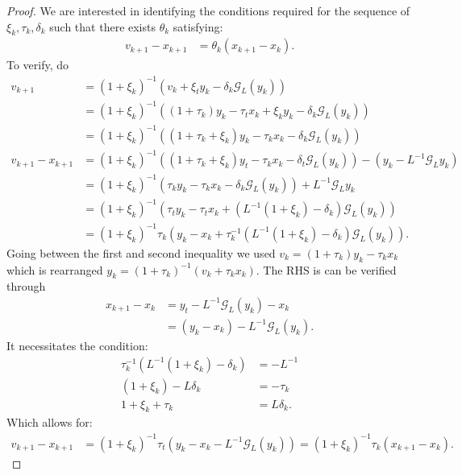 \documentclass[12pt]{article}
\begin{document}
    \begin{proof}
        We are interested in identifying the conditions required for the sequence of $\xi_k, \tau_k, \delta_k$ such that there exists $\theta_k$ satisfying: 
        \begin{align*}
            v_{k + 1} - x_{k + 1} 
            &= \theta_k(x_{k + 1} - x_k).
        \end{align*}
        To verify, do 
        \begin{align*}
            v_{k + 1} &= 
            (1 + \xi_k)^{-1}(v_k + \xi_t y_k - \delta_k \mathcal G_L(y_k))
            \\
            &= 
            (1 + \xi_k)^{-1}((1 + \tau_k)y_k - \tau_t x_k + \xi_k y_k - \delta_k \mathcal G_L(y_k))
            \\
            &= 
            (1 + \xi_k)^{-1}((1 + \tau_k + \xi_k)y_k - \tau_k x_k - \delta_k \mathcal G_L(y_k))
            \\
            v_{k + 1} - x_{k + 1}
            &= 
            (1 + \xi_k)^{-1}((1 + \tau_k + \xi_k)y_t - \tau_k x_k - \delta_t \mathcal G_L(y_k))
            - (y_k - L^{-1}\mathcal G_Ly_k)
            \\
            &= 
            (1 + \xi_k)^{-1}(\tau_ky_k - \tau_k x_k - \delta_k \mathcal G_L(y_k))
            + L^{-1}\mathcal G_Ly_k
            \\
            &= 
            (1 + \xi_k)^{-1}
            \left(
                \tau_ty_k - \tau_t x_k + (L^{-1}(1 + \xi_k) - \delta_k) \mathcal G_L(y_k)
            \right)
            \\
            &= 
            (1 + \xi_k)^{-1}\tau_k
            \left(
                y_k - x_k + 
                \tau_k^{-1}(L^{-1}(1 + \xi_k) - \delta_k) \mathcal G_L(y_k)
            \right).
        \end{align*}
        Going between the first and second inequality we used $v_k = (1 + \tau_k)y_k - \tau_k x_k$ which is rearranged $y_k = (1 + \tau_k)^{-1}(v_k + \tau_k x_k)$. 
        The RHS is can be verified through 
        \begin{align*}
            x_{k + 1} - x_k &= 
            y_t - L^{-1}\mathcal G_L(y_k) - x_k
            \\
            &= (y_k - x_k) - L^{-1}\mathcal G_L(y_k). 
        \end{align*}
        It necessitates the condition: 
        \begin{align*}
            \tau_k^{-1}(L^{-1}(1 + \xi_k) - \delta_k) 
            &= - L^{-1}
            \\
            (1 + \xi_k) - L\delta_k
            &= 
            - \tau_k
            \\
            1 + \xi_k + \tau_k
            &=
            L\delta_k. 
        \end{align*}
        Which allows for: 
        \begin{align*}
            v_{k + 1} - x_{k + 1} &= 
            (1 + \xi_k)^{-1}\tau_t
            \left(y_k - x_k - L^{-1}\mathcal G_L(y_k)\right) 
            = 
            (1 + \xi_k)^{-1}\tau_k(x_{k + 1} - x_k). 
        \end{align*}
    \end{proof}
\end{document}
